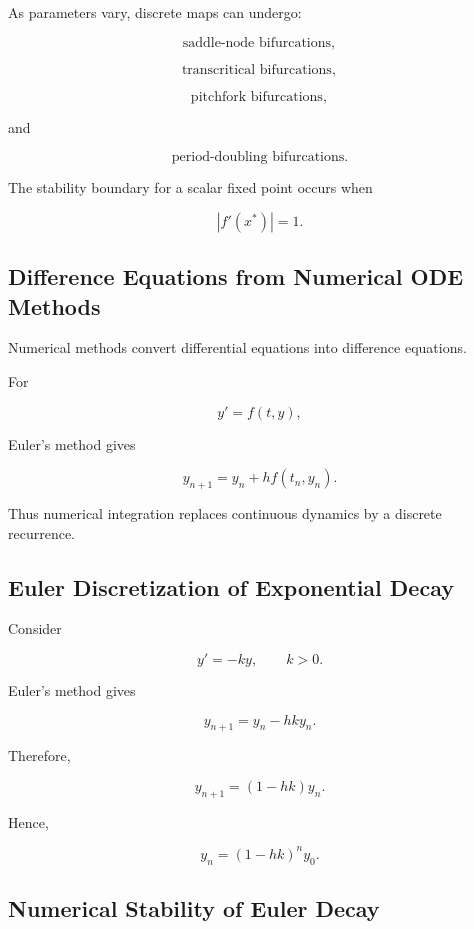 As parameters vary, discrete maps can undergo:

\[
\boxed{
\text{saddle-node bifurcations},
}
\]

\[
\boxed{
\text{transcritical bifurcations},
}
\]

\[
\boxed{
\text{pitchfork bifurcations},
}
\]

and

\[
\boxed{
\text{period-doubling bifurcations}.
}
\]

The stability boundary for a scalar fixed point occurs when

\[
\boxed{
|f'(x^*)|=1.
}
\]

\subsection{Difference Equations from Numerical ODE Methods}
\label{subsec:difference-equations-from-odes}

Numerical methods convert differential equations into difference
equations.

For

\[
y'=f(t,y),
\]

Euler's method gives

\[
\boxed{
y_{n+1}
=
y_n
+
h
f(t_n,y_n).
}
\]

Thus numerical integration replaces continuous dynamics by a discrete
recurrence.

\subsection{Euler Discretization of Exponential Decay}
\label{subsec:euler-discrete-decay}

Consider

\[
y'=-ky,
\qquad
k>0.
\]

Euler's method gives

\[
y_{n+1}
=
y_n
-
hky_n.
\]

Therefore,

\[
\boxed{
y_{n+1}
=
(1-hk)y_n.
}
\]

Hence,

\[
\boxed{
y_n
=
(1-hk)^ny_0.
}
\]

\subsection{Numerical Stability of Euler Decay}
\label{subsec:euler-decay-stability}

